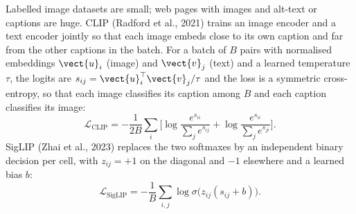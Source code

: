 Labelled image datasets are small; web pages with images and alt-text or captions are huge.
CLIP (Radford et al., 2021) trains an image encoder and a text encoder jointly so that each image
embeds close to its own caption and far from the other captions in the batch. For a batch of
$B$ pairs with normalised embeddings $\vect{u}_i$ (image) and $\vect{v}_j$ (text) and a learned
temperature $\tau$, the logits are $s_{ij}=\vect{u}_i^\top\vect{v}_j/\tau$ and the loss is a
symmetric cross-entropy, so that each image classifies its caption among $B$ and each caption classifies its image:
\begin{equation}
  \mathcal{L}_{\text{CLIP}} = -\frac{1}{2B}\sum_{i}\Big[\log\frac{e^{s_{ii}}}{\sum_j e^{s_{ij}}}
     + \log\frac{e^{s_{ii}}}{\sum_j e^{s_{ji}}}\Big].
\end{equation}
SigLIP (Zhai et al., 2023) replaces the two softmaxes by an independent binary decision per
cell, with $z_{ij}=+1$ on the diagonal and $-1$ elsewhere and a learned bias $b$:
\begin{equation}
  \mathcal{L}_{\text{SigLIP}} = -\frac{1}{B}\sum_{i,j}\log\sigma\big(z_{ij}(s_{ij}+b)\big).
\end{equation}

